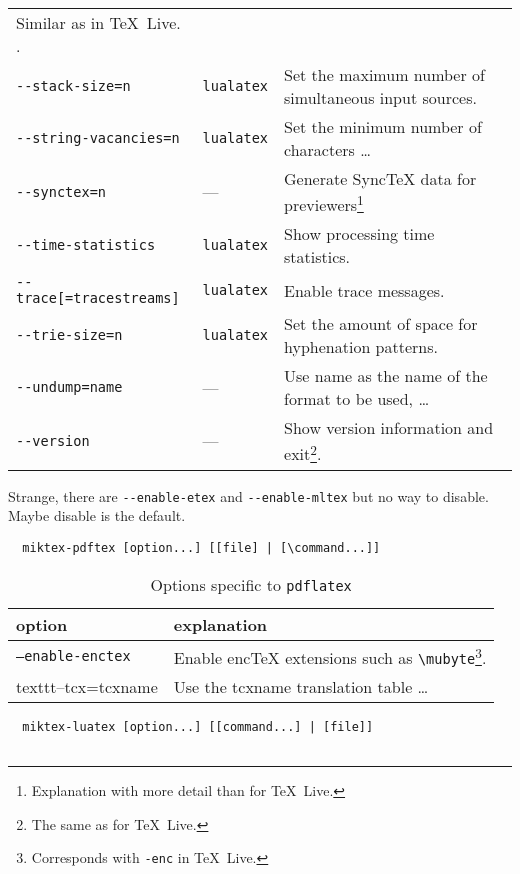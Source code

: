 \documentclass{article}
\newcommand{\pdflatex}{\texttt{pdflatex}}
\newcommand{\lualatex}{\texttt{lualatex}}
\newcommand{\texlive}{\TeX~Live}
\begin{document}
{\begin{longtable}{|lll|}
{Similar as in \texlive. }. \\
\texttt{-{}-stack-size=n}            & \lualatex{} & Set the maximum number of simultaneous input sources. \\
\texttt{-{}-string-vacancies=n}      & \lualatex{} & Set the minimum number of characters \dots \\
\texttt{-{}-synctex=n}               & ---         & Generate SyncTeX data for previewers\footnote%
{Explanation with more detail than for \texlive. } \\
\texttt{-{}-time-statistics}         & \lualatex{} & Show processing time statistics. \\
\texttt{-{}-trace[=tracestreams]}    & \lualatex{} & Enable trace messages. \\
\texttt{-{}-trie-size=n}             & \lualatex{} & Set the amount of space for hyphenation patterns. \\
\texttt{-{}-undump=name}             & ---         & Use name as the name of the format to be used, \dots \\
\texttt{-{}-version}                 & ---         & Show version information and exit\footnote%
{The same as for \texlive. }. \\
\end{longtable}

Strange, there are \texttt{-{}-enable-etex} and \texttt{-{}-enable-mltex} 
but no way to disable. 
Maybe disable is the default. 

\begin{verbatim}
  miktex-pdftex [option...] [[file] | [\command...]]
\end{verbatim}

\begin{longtable}{|ll|}
  \toprule
  option & explanation \\
  \midrule
  \midrule
  \endfirsthead%
  \bottomrule
  \caption{\label{tab:latexOptionsPdflatexMiktex} Options specific to \pdflatex{} }
  \endlastfoot%
  \texttt{--enable-enctex} & Enable encTeX extensions such as \texttt{\textbackslash{}mubyte}\footnote%
  {Corresponds with \texttt{-enc} in \texlive. }. \\
  texttt{--tcx=tcxname}    & Use the tcxname translation table \dots \\
  \end{longtable}




\begin{verbatim}
  miktex-luatex [option...] [[command...] | [file]]


\end{verbatim}}
\end{document}
